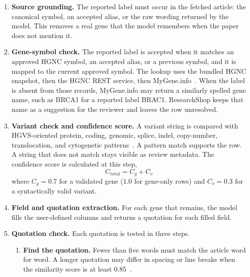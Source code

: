 \begin{enumerate}[leftmargin=*,itemsep=3pt]
    \item \textbf{Source grounding.}
    The reported label must occur in the fetched article: the canonical symbol, an accepted alias, or the raw wording returned by the model. This removes a real gene that the model remembers when the paper does not mention it.

    \item \textbf{Gene-symbol check.}
    The reported label is accepted when it matches an approved HGNC symbol, an accepted alias, or a previous symbol, and it is mapped to the current approved symbol. The lookup uses the bundled HGNC snapshot, then the HGNC REST service, then MyGene.info~\cite{braschi2019genenames,hgnc_rest_docs,wu2013biogps}. When the label is absent from those records, MyGene.info may return a similarly spelled gene name, such as BRCA1 for a reported label BRAC1. ResearchShop keeps that name as a suggestion for the reviewer and leaves the row unresolved.

    \item \textbf{Variant check and confidence score.}
    A variant string is compared with HGVS-oriented protein, coding, genomic, splice, indel, copy-number, translocation, and cytogenetic patterns~\cite{denDunnen2016hgvs}. A pattern match supports the row. A string that does not match stays visible as review metadata. The confidence score is calculated at this step,
    \begin{equation}
    C_{\mathrm{total}} = C_g + C_v
    \label{eq:confidence}
    \end{equation}
    where $C_g = 0.7$ for a validated gene ($1.0$ for gene-only rows) and $C_v = 0.3$ for a syntactically valid variant.

    \item \textbf{Field and quotation extraction.}
    For each gene that remains, the model fills the user-defined columns and returns a quotation for each filled field.

    \item \textbf{Quotation check.}
    Each quotation is tested in three steps.
    \begin{enumerate}[leftmargin=*,itemsep=1pt]
        \item \textbf{Find the quotation.}
        Fewer than five words must match the article word for word. A longer quotation may differ in spacing or line breaks when the similarity score is at least 0.85~\cite{python_difflib,ratcliff1988gestalt}.


\end{enumerate}
\end{enumerate}
